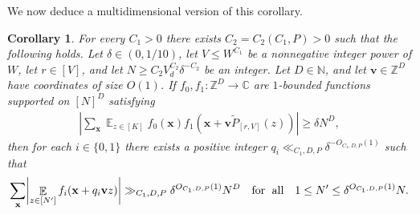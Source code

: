 \documentclass[11pt]{amsart}
\newtheorem{corollary}[lemma]{Corollary}
\theoremstyle{definition}
\DeclareMathOperator*{\E}{\mathbb{E}}
\newcommand{\C}{{\mathbb C}}
\newcommand{\N}{{\mathbb N}}
\newcommand{\Z}{{\mathbb Z}}
\newcommand{\bv}{{\textbf{v}}}
\newcommand{\bx}{{\textbf{x}}}
\newcommand{\abs}[1]{\mathopen{}\left| #1\mathclose{}\right|}
\begin{document}
We now deduce a multidimensional version of this corollary.

\begin{corollary}\label{C: Sarkozy}
        For every $C_1>0$ there exists $C_2 = C_2(C_1, P)>0$ such that the following holds. Let $\delta\in(0, 1/10)$, let $V\leq W^{C_1}$ be a nonnegative integer power of $W$, let $r\in[V]$, and let $N\geq C_2 V_d^{C_2}\delta^{-C_2}$ be an integer. Let $D\in\N$, and let $\bv\in\Z^D$ have coordinates of size $O(1)$. If $f_0, f_1:\Z^D\to\C$ are $1$-bounded functions supported on $[N]^D$ satisfying 
    \begin{align*}
        \abs{\sum_\bx \E_{z\in[K]}f_0(\bx) f_1(\bx+\bv \widetilde{P}_{[r, V]}(z))}\geq \delta N^D,
    \end{align*}
    then for each $i\in\{0,1\}$ there exists a positive integer
    $q_i\ll_{C_1, D,P} \delta^{-O_{C_1, D,P}(1)}$ such that 
    \begin{align*}
        \sum_\bx\abs{\E_{z\in[N']} f_i(\bx + q_i\bv z)}\gg_{C_1, D, P} \delta^{O_{C_1, D, P}(1)}N^{D} \quad\textrm{for\; all}\quad 1\leq N'\leq \delta^{O_{C_1, D,P}(1)} N.
    \end{align*}
\end{corollary}
\end{document}
